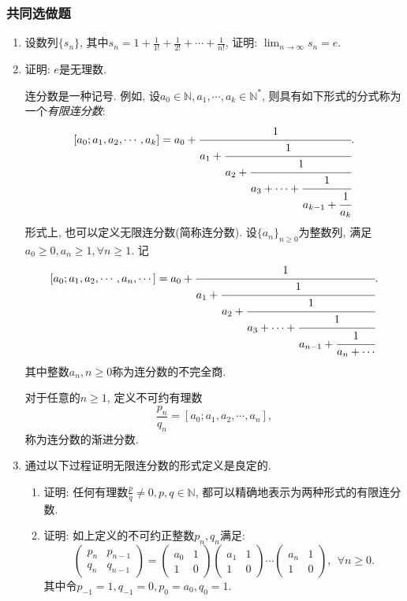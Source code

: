 \documentclass[UTF8,11pt, a4paper, oneside, fontset=none]{ctexbook}
\begin{document}
\subsubsection*{共同选做题}
\begin{enumerate}

\item 设数列$\{ s_n \}$, 其中$s_n = 1 + \frac{1}{1!} + \frac{1}{2!} + \cdots + \frac{1}{n!}$, 证明: $\lim_{n \to \infty} s_n =e$.

\item 证明: $e$是无理数.

\begin{tcolorbox}[colback=white, breakable]

连分数是一种记号. 例如, 设$a_0 \in \mathbb N, a_1, \cdots, a_k \in \mathbb N^*$, 则具有如下形式的分式称为一个{\it 有限连分数}:
\[
[a_0; a_1, a_2, \cdots, a_k] = a_0 + \cfrac{1}{ a_1 + \cfrac{1}{ a_2 + \cfrac{1}{ a_3 + \cdots + \cfrac{1}{a_{k-1} + \cfrac{1}{a_k}}}}}.
\]
形式上, 也可以定义无限连分数(简称连分数). 设$\{ a_n \}_{n \geq 0}$为整数列, 满足$a_0 \geq 0, a_n \geq 1, \forall n \geq 1$. 记
\[
[a_0; a_1, a_2, \cdots, a_n, \cdots] = a_0 + \cfrac{1}{ a_1 + \cfrac{1}{ a_2 + \cfrac{1}{ a_3 + \cdots + \cfrac{1}{a_{n-1} + \cfrac{1}{a_n + \cdots}}}}}.
\]
其中整数$a_n, n \geq 0$称为连分数的不完全商. 

对于任意的$n \geq 1$, 定义不可约有理数
\[
\frac{p_n}{q_n} = [a_0; a_1, a_2, \cdots, a_n],
\]
称为连分数的渐进分数. 

\end{tcolorbox}

\item 通过以下过程证明无限连分数的形式定义是良定的.

\begin{enumerate}
\item 证明: 任何有理数$\frac{p}{q} \neq 0, p, q \in \mathbb N$, 都可以精确地表示为两种形式的有限连分数.

\item 证明: 如上定义的不可约正整数$p_n, q_n$满足:
\[
\left(
\begin{array}{cc}
p_n & p_{n-1}\\
q_n & q_{n-1}
\end{array}
\right)=
\left(
\begin{array}{cc}
a_0 & 1\\
1 & 0
\end{array}
\right)
\left(
\begin{array}{cc}
a_1 & 1\\
1 & 0
\end{array}
\right)\cdots
\left(
\begin{array}{cc}
a_n & 1\\
1 & 0
\end{array}
\right), \ \ \forall n \geq 0.
\]
其中令$p_{-1}=1, q_{-1}=0, p_0 = a_0, q_0 =1$.


\end{enumerate}
\end{enumerate}
\end{document}
